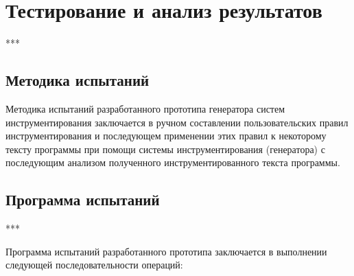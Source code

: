 \chapter{Тестирование и анализ результатов}

***

\section{Методика испытаний}

Методика испытаний разработанного прототипа генератора систем инструментирования заключается в ручном составлении пользовательских правил инструментирования и последующем применении этих правил к некоторому тексту программы при помощи системы инструментирования (генератора) с последующим анализом полученного инструментированного текста программы.

\section{Программа испытаний}

***

Программа испытаний разработанного прототипа заключается в выполнении следующей последовательности операций:

